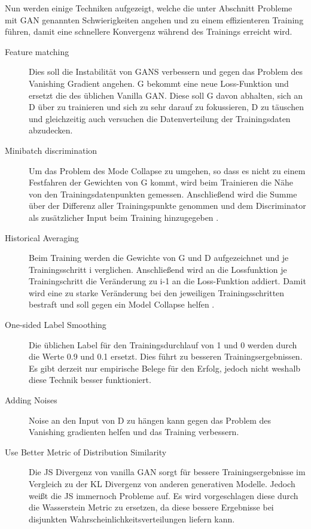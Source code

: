 \documentclass{llncs}
\begin{document}
Nun werden einige Techniken aufgezeigt, welche die unter Abschnitt Probleme mit GAN genannten Schwierigkeiten angehen und zu einem effizienteren Training führen, damit eine schnellere Konvergenz während des Trainings erreicht wird.
\begin{description}
\item[Feature matching]
Dies soll die Instabilität von GANS verbessern und gegen das Problem des Vanishing Gradient angehen. G bekommt eine neue Loss-Funktion und ersetzt die des üblichen Vanilla GAN. Diese soll G davon abhalten, sich an D über zu trainieren und sich zu sehr darauf zu fokussieren, D zu täuschen und gleichzeitig auch versuchen die Datenverteilung der Trainingsdaten abzudecken\cite{improvingan}.\\

\item[Minibatch discrimination] Um das Problem des Mode Collapse zu umgehen, so dass es nicht zu einem Festfahren der Gewichten von G kommt, wird beim Trainieren die Nähe von den Trainingsdatenpunkten gemessen. Anschließend wird die Summe über der Differenz aller Trainingspunkte genommen und dem Discriminator als zusätzlicher Input beim Training hinzugegeben \cite{improvingan}.\\

\item[Historical Averaging] 
Beim Training werden die Gewichte von G und D aufgezeichnet und je Trainingsschritt i verglichen. Anschließend wird an die Lossfunktion je Trainingschritt die Veränderung zu i-1 an die Loss-Funktion addiert. Damit wird eine zu starke Veränderung bei den jeweiligen Trainingsschritten bestraft und soll gegen ein Model Collapse helfen \cite{improvingan}.\\

\item[One-sided Label Smoothing]
Die üblichen Label für den Trainingsdurchlauf von 1 und 0 werden durch die Werte 0.9 und 0.1 ersetzt. Dies führt zu besseren Trainingsergebnissen. Es gibt derzeit nur empirische Belege für den Erfolg, jedoch nicht weshalb diese Technik besser funktioniert\cite{improvingan}.\\

\item[Adding Noises] 
Noise an den Input von D zu hängen kann gegen das Problem des Vanishing gradienten helfen und das Training verbessern\cite{improvingan}.\\

\item[Use Better Metric of Distribution Similarity] 
Die JS Divergenz von vanilla GAN sorgt für bessere Trainingsergebnisse im Vergleich zu der KL Divergenz von anderen generativen Modelle. Jedoch weißt die JS immernoch Probleme auf.  Es wird vorgeschlagen diese durch die Wasserstein Metric zu ersetzen, da diese bessere Ergebnisse bei disjunkten Wahrscheinlichkeitsverteilungen liefern kann\cite{improvingan}.\\


\end{description}
\end{document}
